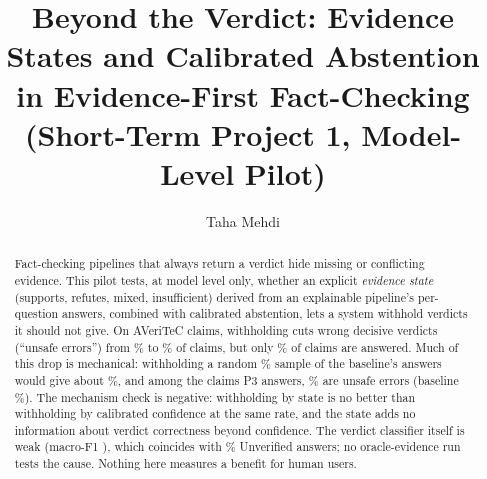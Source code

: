 \documentclass[acmlarge]{acmart}
\begin{document}
\title{Beyond the Verdict: Evidence States and Calibrated Abstention in Evidence-First Fact-Checking (Short-Term Project 1, Model-Level Pilot)}

\author{Taha Mehdi}

\begin{abstract}
Fact-checking pipelines that always return a verdict hide missing or conflicting evidence. This pilot tests, at model level only, whether an explicit \emph{evidence state} (supports, refutes, mixed, insufficient) derived from an explainable pipeline's per-question answers, combined with calibrated abstention, lets a system withhold verdicts it should not give. On \nPool{} AVeriTeC claims, withholding cuts wrong decisive verdicts (``unsafe errors'') from \unsafePZero\% to \unsafePThree\% of claims, but only \covPThree\% of claims are answered. Much of this drop is mechanical: withholding a random \covPThree\% sample of the baseline's answers would give about \randRefPThree\%, and among the claims P3 answers, \ansUnsafePThree\% are unsafe errors (baseline \ansUnsafePZero\%). The mechanism check is negative: withholding by state is no better than withholding by calibrated confidence at the same rate, and the state adds no information about verdict correctness beyond confidence. The verdict classifier itself is weak (macro-F1 \mfPool), which coincides with \unvPool\% Unverified answers; no oracle-evidence run tests the cause. Nothing here measures a benefit for human users.
\end{abstract}


\maketitle

\end{document}

